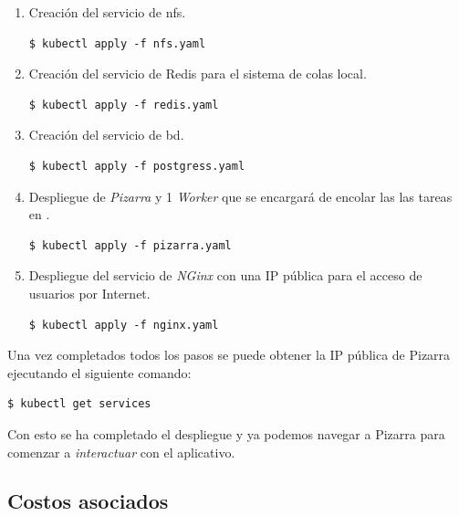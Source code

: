 \documentclass[11pt,spanish,listoffigures,listoftables]{tfgetsinf}
\begin{document}
\begin{enumerate}
\item Creación del servicio de \acrfull{nfs}.
	
	\begin{lstlisting}[style=ascii-tree]
	$ kubectl apply -f nfs.yaml
	\end{lstlisting}
	
\item Creación del servicio de Redis para el sistema de colas local.
	
	\begin{lstlisting}[style=ascii-tree]
	$ kubectl apply -f redis.yaml
	\end{lstlisting}
	
\item Creación del servicio de \acrlong{bd}.
	
	\begin{lstlisting}[style=ascii-tree]
	$ kubectl apply -f postgress.yaml
	\end{lstlisting}
	
\item Despliegue de \textit{Pizarra} y 1 \textit{Worker} que se encargará de encolar las las \Gls{tarea}s en \kahan.
	
	\begin{lstlisting}[style=ascii-tree]
	$ kubectl apply -f pizarra.yaml
	\end{lstlisting}
	
\item Despliegue del servicio de \textit{NGinx} con una IP pública para el acceso de usuarios por Internet.
	
	\begin{lstlisting}[style=ascii-tree]	
	$ kubectl apply -f nginx.yaml
	\end{lstlisting}
	
\end{enumerate}

Una vez completados todos los pasos se puede obtener la IP pública de Pizarra ejecutando el siguiente comando:

\begin{lstlisting}[style=ascii-tree]
$ kubectl get services
\end{lstlisting}

Con esto se ha completado el despliegue y ya podemos navegar a Pizarra para comenzar a \textit{interactuar} con el aplicativo.

\subsection{Costos asociados}
\end{document}
